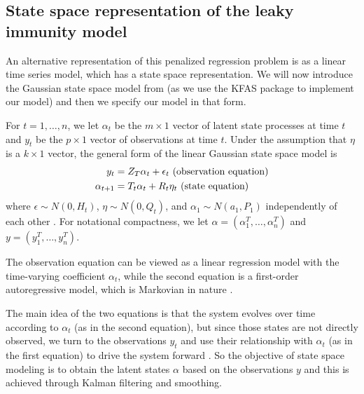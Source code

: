\documentclass{article}
\begin{document}
\subsection{State space representation of the leaky immunity model}

An alternative representation of this penalized regression problem is as a linear time series model, which has a state space representation. We will now introduce the Gaussian state space model from \citet{helske2016kfas} (as we use the KFAS package to implement our model) and then we specify our model in that form.

For $t = 1, \dots, n$, we let $\alpha_t$ be the $m \times 1$ vector of latent state processes at time $t$ and $y_t$ be the $p \times 1$ vector of observations at time $t$. Under the assumption that $\eta$ is a $k \times 1$ vector, the general form of the linear Gaussian state space model is 
\begin{align}
y_t &= Z_T\alpha_t + \epsilon_t  \text{     (observation equation)} \label{eq:ss1}\\
\alpha_{t+1} &= T_t\alpha_t + R_t\eta_t  \text{     (state equation) \label{eq:ss2}}
\end{align}
where $\epsilon \sim N(0, H_t)$, $\eta \sim N(0, Q_t)$, and $\alpha_1 \sim N(a_1, P_1)$ independently of each other \citep{helske2016kfas}. For notational compactness, we let $\alpha = \left ( \alpha_1^T, \dots, \alpha_n^T \right )$ and $y = \left ( y_1^T, \dots, y_n^T \right )$.

The observation equation can be viewed as a linear regression model with the time-varying coefficient $\alpha_t$, while the second equation is a first-order autoregressive model, which is Markovian in nature \citep{durbin2012time}. 

The main idea of the two equations is that the system evolves over time according to $\alpha_t$ (as in the second equation), but since those states are not directly observed, we turn to the observations $y_t$ and use their relationship with $\alpha_t$ (as in the first equation) to drive the system forward \citep{durbin2012time}. So the objective of state space modeling is to obtain the latent states $\alpha$ based on the observations $y$ and this is achieved through Kalman filtering and smoothing. 
\end{document}

